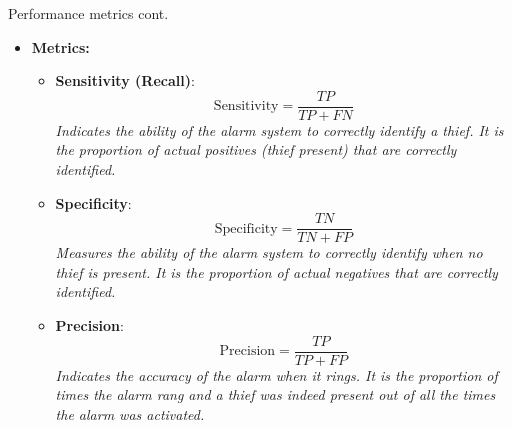 \documentclass[serif, aspectratio=169]{beamer}
\begin{document}
\begin{frame}{Performance metrics cont.}
    \begin{itemize}
        \item \textbf{Metrics:}
        \begin{itemize}
            
            \item \textbf{Sensitivity (Recall)}:
            \[
            \text{Sensitivity} = \frac{TP}{TP + FN}
            \]
            \textit{Indicates the ability of the alarm system to correctly identify a thief. It is the proportion of actual positives (thief present) that are correctly identified.}

            \item \textbf{Specificity}:
            \[
            \text{Specificity} = \frac{TN}{TN + FP}
            \]
            \textit{Measures the ability of the alarm system to correctly identify when no thief is present. It is the proportion of actual negatives that are correctly identified.}

            \item \textbf{Precision}:
            \[
            \text{Precision} = \frac{TP}{TP + FP}
            \]
            \textit{Indicates the accuracy of the alarm when it rings. It is the proportion of times the alarm rang and a thief was indeed present out of all the times the alarm was activated.}
        \end{itemize}
    \end{itemize}
\end{frame}



    
    
    
\end{document}
